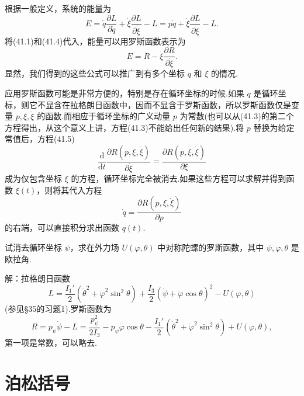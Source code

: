 根据一般定义，系统的能量为
\begin{equation*}
  E=\dot{q}\frac{\partial L}{\partial\dot{q}}
  +\dot{\xi}\frac{\partial L}{\partial\dot{\xi}}-L
  =p\dot{q}+\dot{\xi}\frac{\partial L}{\partial\dot{\xi}}-L.
\end{equation*}
将(41.1)和(41.4)代入，能量可以用罗斯函数表示为
\begin{equation}
  E=R-\dot{\xi}\frac{\partial R}{\partial\dot{\xi}}.
\end{equation}
显然，我们得到的这些公式可以推广到有多个坐标 $q$ 和 $\xi$ 的情况.

应用罗斯函数可能是非常方便的，特别是存在循环坐标的时候.如果 $q$
是循环坐标，则它不显含在拉格朗日函数中，因而不显含于罗斯函数，所以罗斯函数仅是变量
$p,\xi,\dot{\xi}$ 的函数.而相应于循环坐标的广义动量 $p$
为常数(也可以从(41.3)的第二个方程得出，从这个意义上讲，方程(41.3)不能给出任何新的结果).将
$p$ 替换为给定常值后，方程(41.5)
\begin{equation*}
  \frac{\mathrm{d}}{\mathrm{d}t}
  \frac{\partial R(p,\xi,\dot{\xi})}{\partial\dot{\xi}}
  =\frac{\partial R(p,\xi,\dot{\xi})}{\partial\xi}
\end{equation*}
成为仅包含坐标 $\xi$ 的方程，循环坐标完全被消去.如果这些方程可以求解并得到函数
$\xi(t)$，则将其代入方程
\begin{equation*}
  \dot{q}=\frac{\partial R(p,\xi,\dot{\xi})}{\partial p}
\end{equation*}
的右端，可以直接积分求出函数 $q(t)$.

\begin{xiti}

\quad 试消去循环坐标 $\psi$，求在外力场
$U(\varphi,\theta)$ 中对称陀螺的罗斯函数，其中 $\psi,\varphi,\theta$ 是欧拉角.

解：拉格朗日函数
\begin{equation*}
  L=\frac{I_1'}{2}\left(\dot{\theta}^2+\dot{\varphi}^2\sin^2\theta\right)
  +\frac{I_3}{2}\left(\dot{\psi}+\dot{\varphi}\cos\theta\right)^2-U(\varphi,\theta)
\end{equation*}
(参见§35的习题1).罗斯函数为
\begin{equation*}
  R=p_\psi\dot{\psi}-L
  =\frac{p_\psi^2}{2I_3}-p_\psi\dot{\varphi}\cos\theta
  -\frac{I_1'}{2}\left(\dot{\theta}^2+\dot{\varphi}^2\sin^2\theta\right)
  +U(\varphi,\theta),
\end{equation*}
第一项是常数，可以略去.

\end{xiti}

\section{泊松括号}

